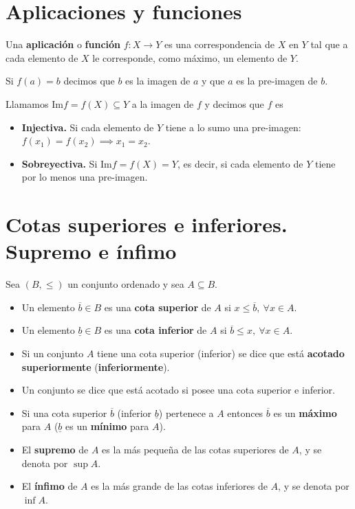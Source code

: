 {\section{Aplicaciones y funciones}
\begin{defi}
    Una \textbf{aplicación} o \textbf{función} $f:X\to Y$ es una correspondencia de $X$ en $Y$ tal que a cada elemento de $X$ le corresponde, como máximo, un elemento de $Y$.
\end{defi}

\begin{defi}
    Si $f\left( a \right) = b$ decimos que $b$ es la imagen de $a$ y que $a$ es la pre-imagen de $b$.
\end{defi}

\begin{defi}
    Llamamos Im$f = f\left( X \right) \subseteq Y$ a la imagen de $f$ y decimos que $f$ es
    \begin{itemize}
        \item\textbf{Injectiva.} Si cada elemento de $Y$ tiene a lo sumo una pre-imagen: $f\left( x_1 \right) = f\left( x_2 \right) \implies x_1 = x_2$.
        \item\textbf{Sobreyectiva.} Si Im$f = f\left( X \right) = Y$, es decir, si cada elemento de $Y$ tiene por lo menos una pre-imagen.
    \end{itemize}
\end{defi}


\section{Cotas superiores e inferiores. Supremo e ínfimo}
\begin{defi}
    Sea $\left( B, \leq \right) $ un conjunto ordenado y sea $A\subseteq B$.
    \begin{itemize}[itemsep = -2pt]
        \item Un elemento $\overline{b}\in B$ es una \textbf{cota superior} de $A$ si $x\leq\overline{b},\ \forall x\in A$.
        \item Un elemento $\underline{b}\in B$ es una \textbf{cota inferior} de $A$ si $\overline{b}\leq x,\ \forall x\in A$.
        \item Si un conjunto $A$ tiene una cota superior (inferior) se dice que está \textbf{acotado superiormente} (\textbf{inferiormente}).
        \item Un conjunto se dice que está acotado si posee una cota superior e inferior.
        \item Si una cota superior $\overline{b}$ (inferior $\underline{b}$) pertenece a $A$ entonces $\overline{b}$ es un \textbf{máximo} para $A$ ($\underline{b}$ es un \textbf{mínimo} para $A$).
        \item El \textbf{supremo} de $A$ es la más pequeña de las cotas superiores de $A$, y se denota por $\sup A$.
        \item El \textbf{ínfimo} de $A$ es la más grande de las cotas inferiores de $A$, y se denota por $\inf A$.
    \end{itemize}
\end{defi}

}
